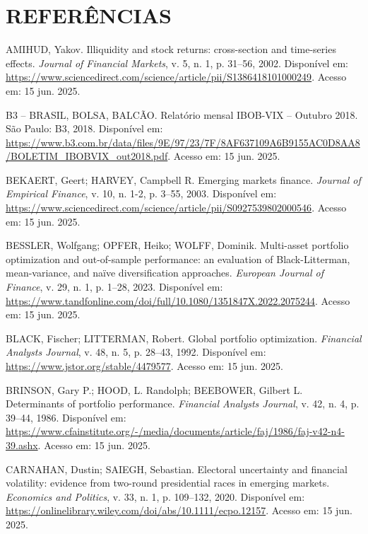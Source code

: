 \chapter*{REFERÊNCIAS}

\vspace{1cm}

\noindent
AMIHUD, Yakov. Illiquidity and stock returns: cross-section and time-series effects. \textit{Journal of Financial Markets}, v. 5, n. 1, p. 31--56, 2002. Disponível em: \url{https://www.sciencedirect.com/science/article/pii/S1386418101000249}. Acesso em: 15 jun. 2025.

\noindent
B3 -- BRASIL, BOLSA, BALCÃO. Relatório mensal IBOB-VIX -- Outubro 2018. São Paulo: B3, 2018. Disponível em: \url{https://www.b3.com.br/data/files/9E/97/23/7F/8AF637109A6B9155AC0D8AA8/BOLETIM_IBOBVIX_out2018.pdf}. Acesso em: 15 jun. 2025.

\noindent
BEKAERT, Geert; HARVEY, Campbell R. Emerging markets finance. \textit{Journal of Empirical Finance}, v. 10, n. 1-2, p. 3--55, 2003. Disponível em: \url{https://www.sciencedirect.com/science/article/pii/S0927539802000546}. Acesso em: 15 jun. 2025.

\noindent
BESSLER, Wolfgang; OPFER, Heiko; WOLFF, Dominik. Multi-asset portfolio optimization and out-of-sample performance: an evaluation of Black-Litterman, mean-variance, and naïve diversification approaches. \textit{European Journal of Finance}, v. 29, n. 1, p. 1--28, 2023. Disponível em: \url{https://www.tandfonline.com/doi/full/10.1080/1351847X.2022.2075244}. Acesso em: 15 jun. 2025.

\noindent
BLACK, Fischer; LITTERMAN, Robert. Global portfolio optimization. \textit{Financial Analysts Journal}, v. 48, n. 5, p. 28--43, 1992. Disponível em: \url{https://www.jstor.org/stable/4479577}. Acesso em: 15 jun. 2025.

\noindent
BRINSON, Gary P.; HOOD, L. Randolph; BEEBOWER, Gilbert L. Determinants of portfolio performance. \textit{Financial Analysts Journal}, v. 42, n. 4, p. 39--44, 1986. Disponível em: \url{https://www.cfainstitute.org/-/media/documents/article/faj/1986/faj-v42-n4-39.ashx}. Acesso em: 15 jun. 2025.

\noindent
CARNAHAN, Dustin; SAIEGH, Sebastian. Electoral uncertainty and financial volatility: evidence from two-round presidential races in emerging markets. \textit{Economics and Politics}, v. 33, n. 1, p. 109--132, 2020. Disponível em: \url{https://onlinelibrary.wiley.com/doi/abs/10.1111/ecpo.12157}. Acesso em: 15 jun. 2025.


